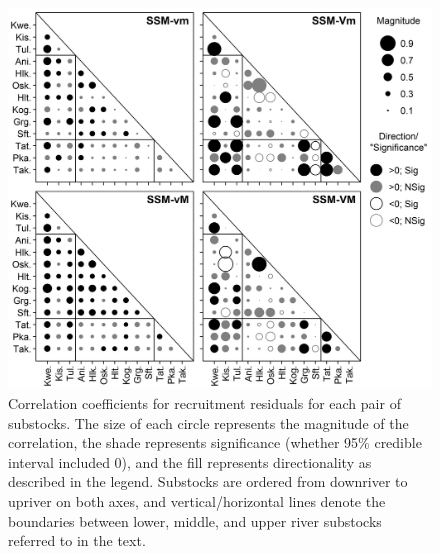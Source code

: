 \documentclass[12pt,]{book}
\theoremstyle{definition}
\theoremstyle{definition}
\theoremstyle{definition}
\theoremstyle{remark}
\begin{document}
\begin{figure}
  \centering
  \includegraphics{img/Ch4/rhos.jpg}
  \caption{Correlation coefficients for recruitment residuals for each pair of substocks. The size of each circle represents the magnitude of the correlation, the shade represents significance (whether 95\% credible interval included 0), and the fill represents directionality as described in the legend. Substocks are ordered from downriver to upriver on both axes, and vertical/horizontal lines denote the boundaries between lower, middle, and upper river substocks referred to in the text.}
  \label{fig:rhos}
\end{figure}

\clearpage
\end{document}
